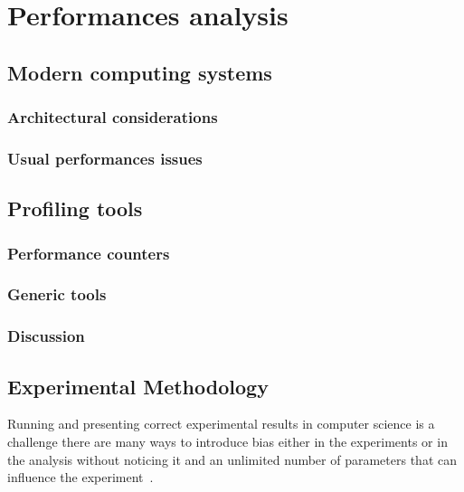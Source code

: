 \chapter{Performances analysis}

\section{Modern computing systems}

\subsection{Architectural considerations}


\subsection{Usual performances issues}



\section{Profiling tools}


\subsection{Performance counters}


\subsection{Generic tools}


\subsection{Discussion}

\section{Experimental Methodology}

Running and presenting correct experimental results in computer science is a
challenge there are many ways to introduce bias either in the experiments or
in the analysis without noticing it and an unlimited number of parameters that
can influence the experiment~\cite{Mytkowicz09Producing}.


